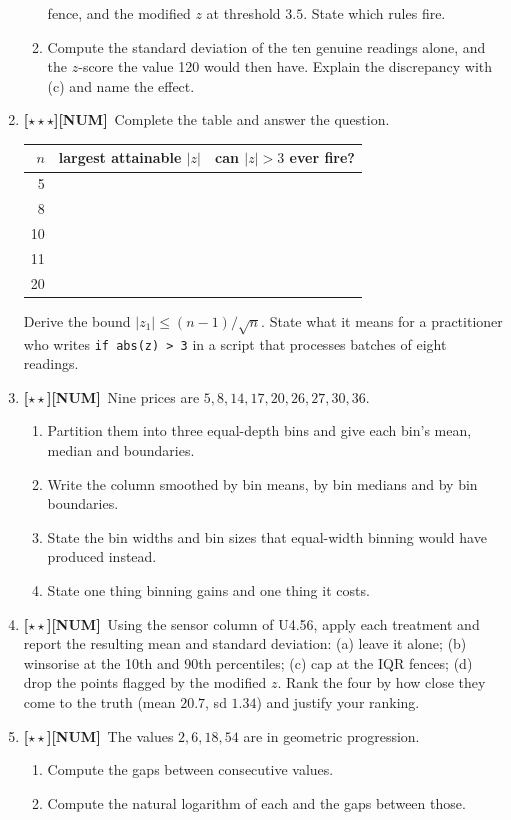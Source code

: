 \documentclass[11pt,a4paper]{article}
\newcommand{\LA}{{\footnotesize\textbf{[$\star\star\star$]}}}
\newcommand{\LB}{{\footnotesize\textbf{[$\star\star$]}}}
\newcommand{\NUM}{{\footnotesize\textbf{[NUM]}}}
\newcommand{\Q}[1]{\item[\textbf{#1}]}
\begin{document}
\begin{enumerate}[leftmargin=2.2cm]
\begin{enumerate}[label=(\alph*)]
      fence, and the modified $z$ at threshold $3.5$. State which rules fire.
    \item Compute the standard deviation of the ten genuine readings alone, and
      the $z$-score the value 120 would then have. Explain the discrepancy with
      (c) and name the effect.
  \end{enumerate}
\Q{U4.57}\LA\NUM\ Complete the table and answer the question.
  \begin{center}\begin{tabular}{@{}rrl@{}}\toprule
  $n$ & largest attainable $|z|$ & can $|z|>3$ ever fire?\\
  \midrule
  5 & & \\ 8 & & \\ 10 & & \\ 11 & & \\ 20 & & \\
  \bottomrule\end{tabular}\end{center}
  Derive the bound $|z_1| \le (n-1)/\sqrt n$. State what it means for a
  practitioner who writes \texttt{if abs(z) > 3} in a script that processes
  batches of eight readings.
\Q{U4.58}\LB\NUM\ Nine prices are $5, 8, 14, 17, 20, 26, 27, 30, 36$.
  \begin{enumerate}[label=(\alph*)]
    \item Partition them into three equal-depth bins and give each bin's mean,
      median and boundaries.
    \item Write the column smoothed by bin means, by bin medians and by bin
      boundaries.
    \item State the bin widths and bin sizes that equal-width binning would
      have produced instead.
    \item State one thing binning gains and one thing it costs.
  \end{enumerate}
\Q{U4.59}\LB\NUM\ Using the sensor column of U4.56, apply each treatment and
  report the resulting mean and standard deviation: (a) leave it alone;
  (b) winsorise at the 10th and 90th percentiles; (c) cap at the IQR fences;
  (d) drop the points flagged by the modified $z$. Rank the four by how close
  they come to the truth (mean $20.7$, sd $1.34$) and justify your ranking.
\Q{U4.60}\LB\NUM\ The values $2, 6, 18, 54$ are in geometric progression.
  \begin{enumerate}[label=(\alph*)]
    \item Compute the gaps between consecutive values.
    \item Compute the natural logarithm of each and the gaps between those.

\end{enumerate}
\end{enumerate}
\end{document}
